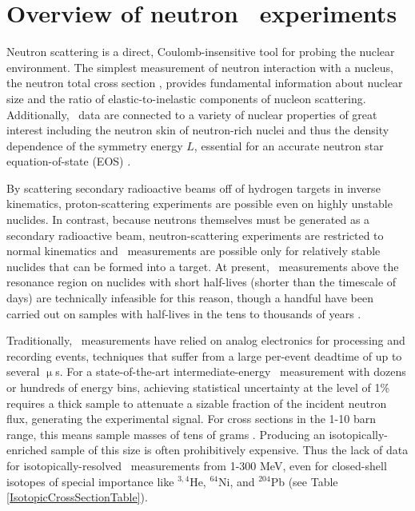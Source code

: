 \section{Overview of neutron \tot\ experiments}

Neutron scattering is a direct, Coulomb-insensitive tool for probing the nuclear
environment. The simplest measurement of neutron interaction with a nucleus,
the neutron total cross section \tot, provides fundamental information about
nuclear size and the ratio of elastic-to-inelastic components of nucleon 
scattering. Additionally, \tot\ data are connected to a variety of nuclear
properties of great interest including the neutron skin of neutron-rich nuclei
\cite{Mahzoon2017} and thus the density dependence of the symmetry energy $L$,
essential for an accurate neutron star equation-of-state (EOS)
\cite{Fattoyev2012, Vinas2014, Brown2000}.

By scattering secondary radioactive beams off of hydrogen targets in \Gls{inverse
kinematics}, proton-scattering experiments are possible even on highly unstable
nuclides. In contrast, because neutrons themselves must be generated as a
secondary radioactive beam, neutron-scattering experiments are restricted to
normal kinematics and \tot\ measurements are possible only for relatively stable
nuclides that can be formed into a target. At present, \tot\ measurements above
the resonance region on nuclides with short half-lives (shorter than the timescale of
days) are technically infeasible for this reason, though a handful have been carried out on
samples with half-lives in the tens to thousands of years \cite{Poenitz1983,
Phillips1980, Foster1971}.

Traditionally, \tot\ measurements have relied on analog electronics for processing and
recording events, techniques that suffer from a large per-event deadtime of
up to several $\upmu$s. For a state-of-the-art intermediate-energy \tot\ measurement
with dozens or hundreds of energy bins, achieving statistical uncertainty at the
level of 1\% requires a thick sample to attenuate a sizable fraction of the
incident neutron flux, generating the experimental signal.
For cross sections in the 1-10 barn range, this means
sample masses of tens of grams \cite{Finlay1993, Abfalterer2001}.
Producing an isotopically-enriched sample of this size is often
prohibitively expensive. Thus the lack of data for isotopically-resolved
\tot\ measurements from 1-300 MeV, even for
closed-shell isotopes of special importance like $^{3,4}$He, $^{64}$Ni, and
$^{204}$Pb (see Table \ref{IsotopicCrossSectionTable}).

